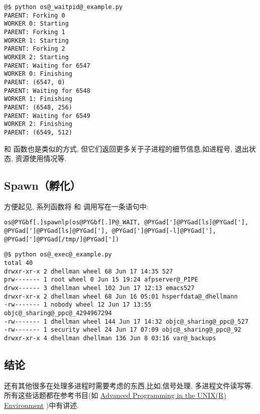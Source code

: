 \documentclass[letterpaper,10pt,english]{manual}
\begin{document}
\begin{Verbatim}[commandchars=@\[\]]
@$ python os@_waitpid@_example.py
PARENT: Forking 0
WORKER 0: Starting
PARENT: Forking 1
WORKER 1: Starting
PARENT: Forking 2
WORKER 2: Starting
PARENT: Waiting for 6547
WORKER 0: Finishing
PARENT: (6547, 0)
PARENT: Waiting for 6548
WORKER 1: Finishing
PARENT: (6548, 256)
PARENT: Waiting for 6549
WORKER 2: Finishing
PARENT: (6549, 512)
\end{Verbatim}

 和  函数也是类似的方式, 但它们返回更多关于子进程的细节信息,如进程号, 退出状态, 资源使用情况等.


\subsection{Spawn（孵化）}

方便起见,  系列函数将  和  调用写在一条语句中:

\begin{Verbatim}[commandchars=@\[\]]
os@PYGbf[.]spawnlp(os@PYGbf[.]P@_WAIT, @PYGad[']@PYGad[ls]@PYGad['], @PYGad[']@PYGad[ls]@PYGad['], @PYGad[']@PYGad[-l]@PYGad['], @PYGad[']@PYGad[/tmp/]@PYGad['])
\end{Verbatim}

\begin{Verbatim}[commandchars=@\[\]]
@$ python os@_exec@_example.py
total 40
drwxr-xr-x 2 dhellman wheel 68 Jun 17 14:35 527
prw------- 1 root wheel 0 Jun 15 19:24 afpserver@_PIPE
drwx------ 3 dhellman wheel 102 Jun 17 12:13 emacs527
drwxr-xr-x 2 dhellman wheel 68 Jun 16 05:01 hsperfdata@_dhellmann
-rw------- 1 nobody wheel 12 Jun 17 13:55 objc@_sharing@_ppc@_4294967294
-rw------- 1 dhellman wheel 144 Jun 17 14:32 objc@_sharing@_ppc@_527
-rw------- 1 security wheel 24 Jun 17 07:09 objc@_sharing@_ppc@_92
drwxr-xr-x 4 dhellman dhellman 136 Jun 8 03:16 var@_backups
\end{Verbatim}


\subsection{结论}

还有其他很多在处理多进程时需要考虑的东西,比如,信号处理, 多进程文件读写等.所有这些话题都在参考书目(如 \href{http://www.amazon.com/Programming-Environment-Addison-Wesley-Professional-Computing/dp/0201433079/ref=pd\_bbs\_3/002-2842372-4768037?ie=UTF8\&s=books\&amp;qid=1182098757\&sr=8-3}{Advanced Programming in the UNIX(R) Environment} )中有讲述.
\end{document}
